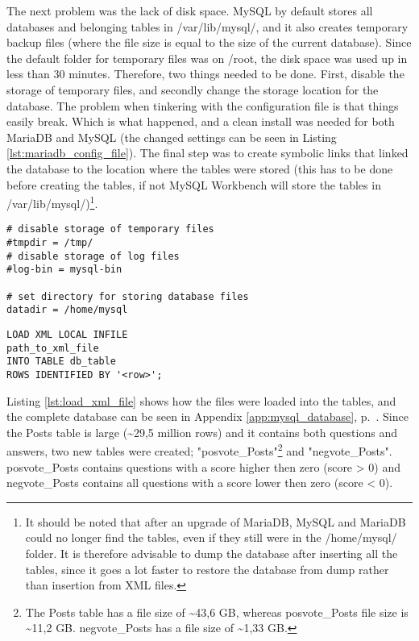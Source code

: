 \noindent
The next problem was the lack of disk space. 
MySQL by default stores all databases and belonging tables in /var/lib/mysql/, and it also creates temporary backup files 
(where the file size is equal to the size of the current database). 
Since the default folder for temporary files was on /root, the disk space was used up in less than 30 minutes. 
Therefore, two things needed to be done. First, disable the storage of temporary files, and secondly change the storage location for the database. 
The problem when tinkering with the configuration file is that things easily break. 
Which is what happened, and a clean install was needed for both MariaDB and MySQL (the changed settings can be seen in Listing  \ref{lst:mariadb_config_file}). 
The final step was to create symbolic links that linked the database to the  location where the tables were stored 
(this has to be done before creating the tables, if not MySQL  Workbench will store the tables in /var/lib/mysql/)\footnote{
	It should be noted that after an upgrade of MariaDB, MySQL and MariaDB could no longer find the tables, even if they still were in the /home/mysql/ folder. 
	It is therefore advisable to dump the database after inserting all the tables, since it goes a lot faster to restore the database from dump rather than insertion from XML files.
	}. 
\begin{lstlisting}[caption={Changes made to config file: /etc/mysql/my.cnf}, label={lst:mariadb_config_file}] 
# disable storage of temporary files
#tmpdir = /tmp/		  
# disable storage of log files
#log-bin = mysql-bin  

# set directory for storing database files
datadir = /home/mysql 
\end{lstlisting}

\begin{lstlisting}[caption={Load XML file into a table in the MySQL database}, label={lst:load_xml_file}] 
LOAD XML LOCAL INFILE 
path_to_xml_file
INTO TABLE db_table
ROWS IDENTIFIED BY '<row>';
\end{lstlisting}

\noindent
Listing \ref{lst:load_xml_file} shows how the files were loaded into the tables, and the complete database can be seen in Appendix \ref{app:mysql_database}, p.~\pageref{app:mysql_database}. 
Since the Posts table is large (\textasciitilde 29,5 million rows) and it contains both questions and answers, two new tables were created; 
"posvote\_Posts"\footnote{
	The Posts table has a file size of \textasciitilde 43,6 GB, 
	whereas posvote\_Posts file size is \textasciitilde 11,2 GB. 
	negvote\_Posts has a file size of \textasciitilde 1,33 GB.
	} 
and "negvote\_Posts". 
posvote\_Posts contains questions with a score higher then zero (score > 0) and negvote\_Posts contains all questions with a score lower then zero (score < 0).

